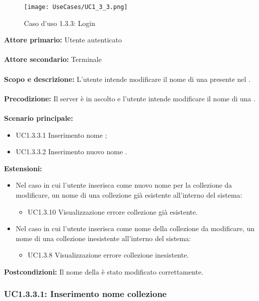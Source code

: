 \documentclass{scalatekids-article}
\begin{document}
\begin{figure}[H]
  \begin{center}
    \texttt{[image: UseCases/UC1\_3\_3.png]}
    \caption*{Caso d'uso 1.3.3: Login}
  \end{center}
\end{figure}
\textbf{Attore primario:} Utente autenticato\\ \\
\textbf{Attore secondario:} Terminale\\ \\
\textbf{Scopo e descrizione:} L’utente intende modificare il nome di una  presente nel .\\ \\
\textbf{Precodizione:} Il server è in ascolto e l’utente intende modificare il nome di una .\\ \\
\textbf{Scenario principale:}
\begin{itemize}
  \item UC1.3.3.1 Inserimento nome ;
  \item UC1.3.3.2 Inserimento nuovo nome .
\end{itemize}
\textbf{Estensioni:}
\begin{itemize}
  \item Nel caso in cui l'utente inserisca come nuovo nome per la collezione da modificare, un nome di una collezione già esistente all'interno del sistema:
  \begin{itemize}
    \item UC1.3.10 Visualizzazione errore collezione già esistente.
  \end{itemize}
  \item Nel caso in cui l'utente inserisca come nome della collezione da modificare, un nome di una collezione inesistente all'interno del sistema:
  \begin{itemize}
    \item UC1.3.8 Visualizzazione errore collezione inesistente.
  \end{itemize}
\end{itemize}
\textbf{Postcondizioni:} Il nome della  è stato modificato correttamente.

\subsubsection{UC1.3.3.1: Inserimento nome collezione}
\end{document}
